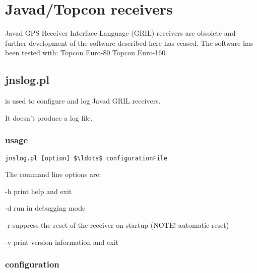 \section{Javad/Topcon receivers}


Javad GPS Receiver Interface Language (GRIL) receivers are obsolete and further development of the software
described here has ceased.
The software has been tested with:
Topcon Euro-80
Topcon Euro-160

\subsection{jnslog.pl}
\hypertarget{h:jnslog}{}

 is used to configure and log Javad 
 GRIL receivers.

It doesn't produce a log file.

\subsubsection{usage}

\begin{lstlisting}[mathescape=true]
jnslog.pl [option] $\ldots$ configurationFile
\end{lstlisting}

The command line options are:
\begin{description*}
 \item[-h] print help and exit
 \item[-d] run in debugging mode
 \item[-r] suppress the reset of the receiver on startup (NOTE! automatic reset)
 \item[-v] print version information and exit
\end{description*}

\subsubsection{configuration}

